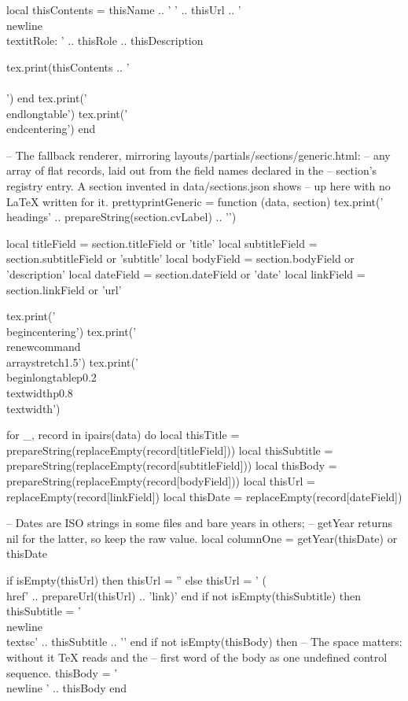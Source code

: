 \documentclass[letterpaper, 10pt]{article}
\newcommand{\headings}[1]{\section*{#1} \hrule \vspace{10pt}}
\begin{document}
\begin{luacode}
			local thisContents = thisName .. ' ' .. thisUrl ..
								'\\newline\\textit{Role: }' .. thisRole ..
								thisDescription

			tex.print(thisContents .. ' \\\\')
		end
		tex.print('\\end{longtable}')
		tex.print('\\end{centering}')
	end

	-- The fallback renderer, mirroring layouts/partials/sections/generic.html:
	-- any array of flat records, laid out from the field names declared in the
	-- section's registry entry. A section invented in data/sections.json shows
	-- up here with no LaTeX written for it.
	prettyprintGeneric = function (data, section)
		tex.print('\\headings{' .. prepareString(section.cvLabel) .. '}')

		local titleField    = section.titleField or 'title'
		local subtitleField = section.subtitleField or 'subtitle'
		local bodyField     = section.bodyField or 'description'
		local dateField     = section.dateField or 'date'
		local linkField     = section.linkField or 'url'

		tex.print('\\begin{centering}')
		tex.print('\\renewcommand{\\arraystretch}{1.5}')
		tex.print('\\begin{longtable}{p{0.2\\textwidth}p{0.8\\textwidth}}')

		for _, record in ipairs(data) do
			local thisTitle    = prepareString(replaceEmpty(record[titleField]))
			local thisSubtitle = prepareString(replaceEmpty(record[subtitleField]))
			local thisBody     = prepareString(replaceEmpty(record[bodyField]))
			local thisUrl      = replaceEmpty(record[linkField])
			local thisDate     = replaceEmpty(record[dateField])

			-- Dates are ISO strings in some files and bare years in others;
			-- getYear returns nil for the latter, so keep the raw value.
			local columnOne = getYear(thisDate) or thisDate

			if isEmpty(thisUrl) then
				thisUrl = ''
			else
				thisUrl = ' (\\href{' .. prepareUrl(thisUrl) .. '}{link})'
			end
			if not isEmpty(thisSubtitle) then
				thisSubtitle = '\\newline\\textsc{' .. thisSubtitle .. '}'
			end
			if not isEmpty(thisBody) then
				-- The space matters: without it TeX reads \newline and the
				-- first word of the body as one undefined control sequence.
				thisBody = '\\newline ' .. thisBody
			end


\end{luacode}
\end{document}
